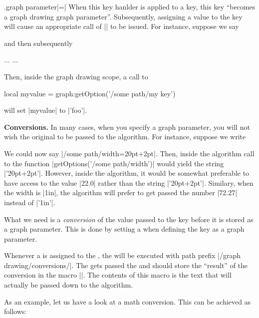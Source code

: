 \begin{handler}{{.graph parameter}|=|}
  When this key hanlder is applied to a key, this key ``becomes a
  graph drawing graph parameter''. Subsequently, assigning a value to
  the key will cause an appropriate call of |\pgfgdgraphparameter| to
  be issued. For instance, suppose we say
\begin{codeexample}
\end{codeexample}
  and then subsequently
\begin{codeexample}
...
\pgfgdbeginscope
  ...
\pgfgdendscope
\end{codeexample}
  Then, inside the graph drawing scope, a call to
\begin{codeexample}
   local myvalue = graph:getOption('/some path/my key')
\end{codeexample}
  will set |myvalue| to |'foo'|.
  
  \medskip
  \noindent\textbf{Conversions.}
  In many cases, when you specify a graph parameter, you will not wish
  the original  to be passed to the algorithm. For
  instance, suppose we write 
\begin{codeexample}
\end{codeexample}
  We could now say |/some path/width=20pt+2pt|. Then, inside the 
  algorithm call to the function |getOptions('/some path/width')| would yield the
  string |'20pt+2pt'|. However, inside the algorithm, it would be
  somewhat preferable to have access to the value |22.0| rather than the
  string |'20pt+2pt'|. Similary, when the width is |1in|, the algorithm
  will   prefer to get passed the number |72.27| instead of |'1in'|.

  What we need is a \emph{conversion} of the value passed to the key
  before it is stored as a graph parameter. This is done by setting
  a  when defining the key as a graph parameter. 
  
  Whenever a  is assigned to the , the
   will be executed with path prefix
  |/graph drawing/conversions/|. The  gets passed the
   and should store the ``result'' of the
  conversion in the macro |\pgfgdresult|. The contents of this macro is
  the text that will actually be passed down to the algorithm.

  As an example, let us have a look at a math conversion. This can be
  achieved as follows:
\begin{codeexample}
\end{codeexample}


\end{handler}
